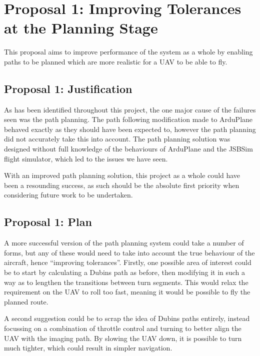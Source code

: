 \section{Proposal 1: Improving Tolerances at the Planning Stage} 
\label{future:tolerance}
This proposal aims to improve performance of the system as a whole by enabling paths to be planned which are more realistic for a UAV to be able to fly.

\subsection{Proposal 1: Justification} 
\label{future:proposal1:justification}
 As has been identified throughout this project, the one major cause of the failures seen was the path planning. The path following modification made to ArduPlane behaved exactly as they should have been expected to, however the path planning did not accurately take this into account. The path planning solution was designed without full knowledge of the behaviours of ArduPlane and the JSBSim flight simulator, which led to the issues we have seen. 

With an improved path planning solution, this project as a whole could have been a resounding success, as such should be the absolute first priority when considering future work to be undertaken.

\subsection{Proposal 1: Plan} 
\label{future:proposal1:plan}

A more successful version of the path planning system could take a number of forms, but any of these would need to take into account the true behaviour of the aircraft, hence ``improving tolerances''. Firstly, one possible area of interest could be to start by calculating a Dubins path as before, then modifying it in such a way as to lengthen the transitions between turn segments. This would relax the requirement on the UAV to roll too fast, meaning it would be possible to fly the planned route.

A second suggestion could be to scrap the idea of Dubins paths entirely, instead focussing on a combination of throttle control and turning to better align the UAV with the imaging path. By slowing the UAV down, it is possible to turn much tighter, which could result in simpler navigation. 

